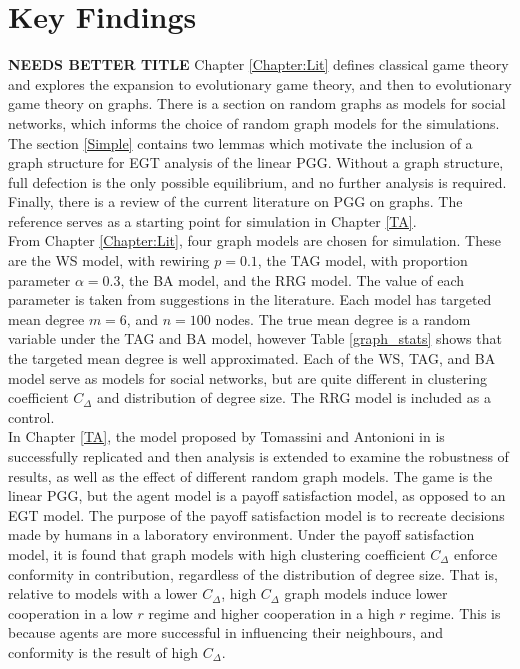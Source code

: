 \section{Key Findings} \textbf{NEEDS BETTER TITLE}
Chapter \ref{Chapter:Lit} defines classical game theory and explores the expansion to evolutionary game theory, and then to evolutionary game theory on graphs. There is a section on random graphs as models for social networks, which informs the choice of random graph models for the simulations. The section \ref{Simple} contains two lemmas which motivate the inclusion of a graph structure for EGT analysis of the linear PGG. Without a graph structure, full defection is the only possible equilibrium, and no further analysis is required. Finally, there is a review of the current literature on PGG on graphs. The reference \cite{RN49} serves as a starting point for simulation in Chapter \ref{TA}. \\

From Chapter \ref{Chapter:Lit}, four graph models are chosen for simulation. These are the WS model, with rewiring $p=0.1$, the TAG model, with proportion parameter $\alpha=0.3$, the BA model, and the RRG model. The value of each parameter is taken from suggestions in the literature. Each model has targeted mean degree $m=6$, and $n=100$ nodes. The true mean degree is a random variable under the TAG and BA model, however Table \ref{graph_stats} shows that the targeted mean degree is well approximated. Each of the WS, TAG, and BA model serve as models for social networks, but are quite different in clustering coefficient $C_\Delta$ and distribution of degree size. The RRG model is included as a control. \\


In Chapter \ref{TA}, the model proposed by Tomassini and Antonioni in \cite{RN49} is successfully replicated and then analysis is extended to examine the robustness of results, as well as the effect of different random graph models. The game is the linear PGG, but the agent model is a payoff satisfaction model, as opposed to an EGT model. The purpose of the payoff satisfaction model is to recreate decisions made by humans in a laboratory environment. Under the payoff satisfaction model, it is found that graph models with high clustering coefficient $C_\Delta$ enforce conformity in contribution, regardless of the distribution of degree size. That is, relative to models with a lower $C_\Delta$, high $C_\Delta$ graph models induce lower cooperation in a low $r$ regime and higher cooperation in a high $r$ regime. This is because agents are more successful in influencing their neighbours, and conformity is the result of high $C_\Delta$. \\

